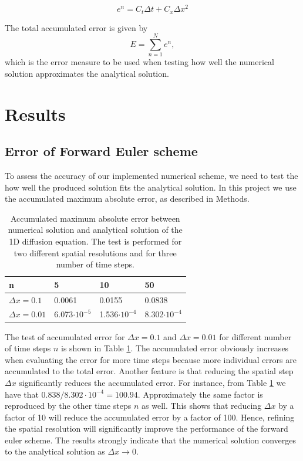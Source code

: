 \documentclass[12pt]{extarticle}
\begin{document}
\[ e^n = C_t\Delta t + C_x\Delta x^2 \]

The total accumulated error is given by
\[ E = \sum_{n=1}^N e^n, \]
which is the error measure to be used when testing how well the numerical solution approximates the analytical solution.



\section{Results}

\subsection*{Error of Forward Euler scheme}

To assess the accuracy of our implemented numerical scheme, we need to test the how well the produced solution fits the analytical solution. In this project we use the accumulated maximum absolute error, as described in Methods.

\begin{table}[h]
	\centering
	\begin{tabular}{|l|l|l|l|}
		\hline
		\textbf{n}      & \textbf{5} & \textbf{10} & \textbf{50} \\ \hline
		$\Delta x=0.1$  & 0.0061     & 0.0155       & 0.0838       \\ \hline
		$\Delta x=0.01$ & 6.073$\cdot 10^{-5}$      & 1.536$\cdot 10^{-4}$       &   8.302$\cdot 10^{-4}$     \\ \hline
	\end{tabular}
\caption{Accumulated maximum absolute error between numerical solution and analytical solution of the 1D diffusion equation. The test is performed for two different spatial resolutions and for three number of time steps.}
\label{tab:errors}
\end{table}

The test of accumulated error for $\Delta x=0.1$ and $\Delta x=0.01$ for different number of time steps $n$ is shown in Table \ref{tab:errors}. The accumulated error obviously increases when evaluating the error for more time steps because more individual errors are accumulated to the total error. Another feature is that reducing the spatial step $\Delta x$ significantly reduces the accumulated error. For instance, from Table \ref{tab:errors} we have that $0.838/8.302\cdot 10^{-4}=100.94$. Approximately the same factor is reproduced by the other time steps $n$ as well. This shows that reducing $\Delta x$ by a factor of 10 will reduce the accumulated error by a factor of 100. Hence, refining the spatial resolution will significantly improve the performance of the forward euler scheme. The results strongly indicate that the numerical solution converges to the analytical solution as $\Delta x \rightarrow 0$. 
\end{document}

